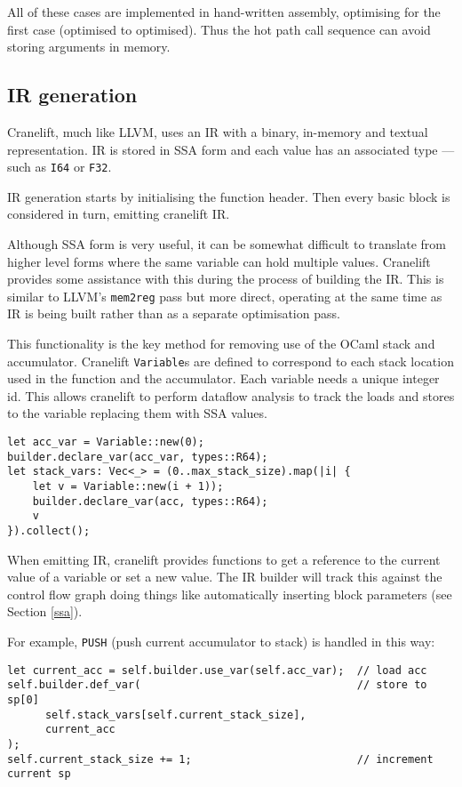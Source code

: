 All of these cases are implemented in hand-written assembly, optimising for the first case
(optimised to optimised). Thus the hot path call sequence can avoid storing arguments in memory.

\subsection{IR generation} \label{opt-irgen}

Cranelift, much like LLVM, uses an IR with a binary, in-memory and textual representation. IR is
stored in SSA form and each value has an associated type --- such as \texttt{I64} or \texttt{F32}.

IR generation starts by initialising the function header. Then every basic block is considered in
turn, emitting cranelift IR.

Although SSA form is very useful, it can be somewhat difficult to translate from higher level forms
where the same variable can hold multiple values. Cranelift provides some assistance with this
during the process of building the IR. This is similar to LLVM's \texttt{mem2reg} pass but more
direct, operating at the same time as IR is being built rather than as a separate optimisation
pass.

This functionality is the key method for removing use of the OCaml stack and accumulator. Cranelift
\texttt{Variable}s are defined to correspond to each stack location used in the function and the
accumulator.
Each variable needs a unique integer id. This allows cranelift to perform dataflow analysis to
track the loads and stores to the variable replacing them with SSA values.

\begin{verbatim}
let acc_var = Variable::new(0);
builder.declare_var(acc_var, types::R64);
let stack_vars: Vec<_> = (0..max_stack_size).map(|i| {
    let v = Variable::new(i + 1));
    builder.declare_var(acc, types::R64);
    v
}).collect();
\end{verbatim}

When emitting IR, cranelift provides functions to get a reference to the current value of a
variable
or set a new value.  The IR builder will track this against the control flow graph doing things
like automatically inserting block parameters (see Section \ref{ssa}).

For example, \texttt{PUSH} (push current accumulator to stack) is handled in this way:

\begin{verbatim}
let current_acc = self.builder.use_var(self.acc_var);  // load acc
self.builder.def_var(                                  // store to sp[0]
      self.stack_vars[self.current_stack_size],
      current_acc
);
self.current_stack_size += 1;                          // increment current sp
\end{verbatim}

